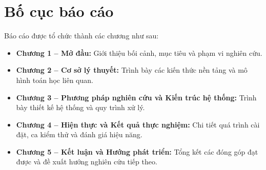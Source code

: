 \section{Bố cục báo cáo}
\label{sec:organization}

Báo cáo được tổ chức thành các chương như sau:
\begin{itemize}
    \item \textbf{Chương 1 -- Mở đầu:} Giới thiệu bối cảnh, mục tiêu và phạm vi nghiên cứu.
    \item \textbf{Chương 2 -- Cơ sở lý thuyết:} Trình bày các kiến thức nền tảng và mô hình toán học liên quan.
    \item \textbf{Chương 3 -- Phương pháp nghiên cứu và Kiến trúc hệ thống:} Trình bày thiết kế hệ thống và quy trình xử lý.
    \item \textbf{Chương 4 -- Hiện thực và Kết quả thực nghiệm:} Chi tiết quá trình cài đặt, ca kiểm thử và đánh giá hiệu năng.
    \item \textbf{Chương 5 -- Kết luận và Hướng phát triển:} Tổng kết các đóng góp đạt được và đề xuất hướng nghiên cứu tiếp theo.
\end{itemize}
